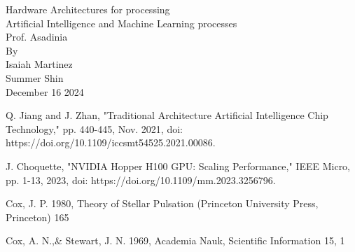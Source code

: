 \documentclass[a4paper,12pt]{article}
\begin{document}
    \begin{titlepage}
        \centering
        Hardware Architectures for processing\\
        Artificial Intelligence and Machine Learning processes\\
        [1.5in]
        
        Prof. Asadinia\\
        [1.5in]
        
        By\\
        Isaiah Martinez\\
        Summer Shin\\

        \vspace{\fill}
        December 16 2024\\
    \end{titlepage}

    
    
    
    

    \begin{thebibliography}{}

         Q. Jiang and J. Zhan, "Traditional Architecture Artificial Intelligence Chip Technology," pp. 440-445, Nov. 2021, doi: https://doi.org/10.1109/iccsmt54525.2021.00086.

         J. Choquette, "NVIDIA Hopper H100 GPU: Scaling Performance," IEEE Micro, pp. 1-13, 2023, doi: https://doi.org/10.1109/mm.2023.3256796.

         Cox, J. P. 1980,
            Theory of Stellar Pulsation
            (Princeton University Press, Princeton) 165

         Cox, A. N.,\& Stewart, J. N. 1969,
            Academia Nauk, Scientific Information 15, 1

    \end{thebibliography}
\end{document}
